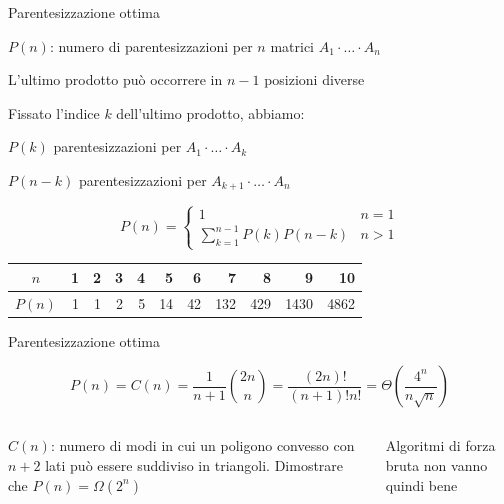 \begin{frame}{Parentesizzazione ottima}

\vspace{-6pt}
\BIL
\item $P(n)$: numero di parentesizzazioni per $n$ matrici $A_1 \cdot \ldots \cdot A_n$
\item L'ultimo prodotto può occorrere in $n-1$ posizioni diverse
\item Fissato l'indice $k$ dell'ultimo prodotto, abbiamo:
\BI
\item $P(k)$ parentesizzazioni per $A_1 \cdot \ldots \cdot A_k$
\item $P(n-k)$ parentesizzazioni per $A_{k+1} \cdot \ldots \cdot A_n$
\EI
\EIL

\[
  P(n) = \begin{cases}
    1 & n = 1 \\
    \sum_{k=1}^{n-1} P(k)P(n-k) & n>1
    \end{cases}
\]

\smallskip
\begin{center}
\begin{tabular}{|c|r|r|r|r|r|r|r|r|r|r|}
\hline
$n$ & \phantom{0}1 & \phantom{0}2 & \phantom{0}3 & \phantom{0}4 & \phantom{0}5 & \phantom{0}6 & \phantom{0}7 & \phantom{0}8 & \phantom{0}9 & \phantom{0}10 \\\hline
$P(n)$ & 1 & 1 & 2 & 5 & 14 & 42 & 132 & 429 & 1430 & 4862 \\\hline
\end{tabular}
\end{center}
\end{frame}

\begin{frame}{Parentesizzazione ottima}

\vspace{-6pt}
\begin{myboxtitle}
\[
P(n) = C(n) = \frac{1}{n+1} {2n\choose n} = \frac{(2n)!}{(n+1)!n!} = \Theta\left(\frac{4^n}{n \sqrt{n}}\right)
\]
\end{myboxtitle}

\begin{columns}[T]
$C(n)$: numero di modi in cui un poligono convesso con $n+2$ lati può essere suddiviso in triangoli.
Dimostrare che $P(n) = \Omega(2^n)$

Algoritmi di forza bruta non vanno quindi bene
\end{columns}

\end{frame}


